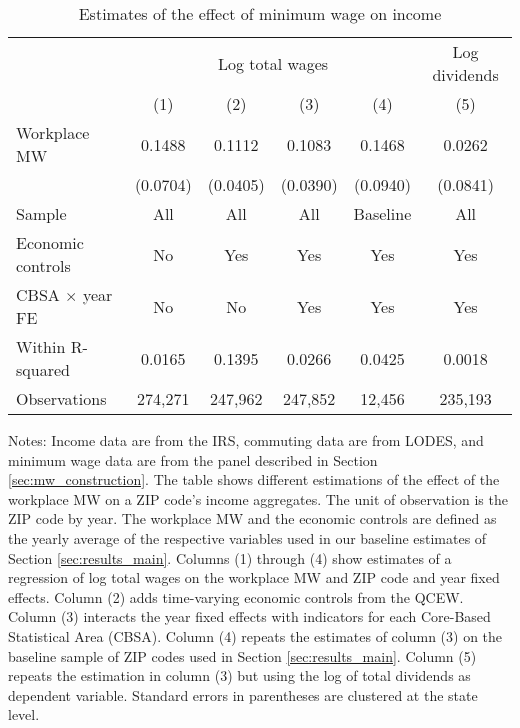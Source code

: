 \begin{table}[hbt!]
    \centering
    \caption{Estimates of the effect of minimum wage on income}
    \label{tab:static_wages}

    \begin{tabular}{@{}lccccc@{}}
        \toprule
                                & \multicolumn{4}{c}{Log total wages}
                                & \multicolumn{1}{c}{Log dividends}                        \\ \cmidrule(lr){2-5}\cmidrule(lr){6-6}
                                & (1)       & (2)      & (3)      & (4)       & (5)        \\ \midrule
        Workplace MW            & 0.1488       & 0.1112      & 0.1083      & 0.1468       & 0.0262        \\
                                & (0.0704)     & (0.0405)    & (0.0390)    & (0.0940)     & (0.0841)      \\ \midrule
        Sample                  & All       & All      & All      & Baseline  & All        \\
        Economic controls       & No        & Yes      & Yes      & Yes       & Yes        \\
        CBSA $\times$ year FE   & No        & No       & Yes      & Yes       & Yes        \\
        Within R-squared        & 0.0165       & 0.1395      & 0.0266      & 0.0425       & 0.0018        \\
        Observations            & 274,271      & 247,962     & 247,852     & 12,456      & 235,193       \\ \bottomrule
    \end{tabular}

    \begin{minipage}{.95\textwidth} \footnotesize
        \vspace{2mm}
        Notes: 
        Income data are from the IRS, commuting data are from LODES, and minimum wage 
        data are from the panel described in Section \ref{sec:mw_construction}.
        The table shows different estimations of the effect of the workplace MW
        on a ZIP code's income aggregates.
        The unit of observation is the ZIP code by year.
        The workplace MW and the economic controls are defined as the yearly 
        average of the respective variables used in our baseline estimates of 
        Section \ref{sec:results_main}.
        Columns (1) through (4) show estimates of a regression of log total wages
        on the workplace MW and ZIP code and year fixed effects.
        Column (2) adds time-varying economic controls from the QCEW.
        Column (3) interacts the year fixed effects with indicators for each
        Core-Based Statistical Area (CBSA).
        Column (4) repeats the estimates of column (3) on the baseline sample
        of ZIP codes used in Section \ref{sec:results_main}.
        Column (5) repeats the estimation in column (3) but using the log of 
        total dividends as dependent variable.
        Standard errors in parentheses are clustered at the state level.
    \end{minipage}
\end{table}

